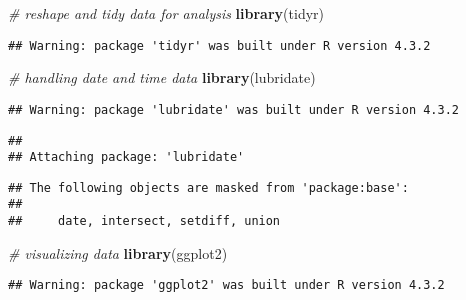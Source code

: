 \documentclass[
]{article}
\newenvironment{Shaded}{\begin{snugshade}}{\end{snugshade}}
\newcommand{\CommentTok}[1]{\textcolor[rgb]{0.56,0.35,0.01}{\textit{#1}}}
\newcommand{\FunctionTok}[1]{\textcolor[rgb]{0.13,0.29,0.53}{\textbf{#1}}}
\newcommand{\NormalTok}[1]{#1}
\begin{document}
\begin{Shaded}
\begin{Highlighting}[]
\CommentTok{\# reshape and tidy data for analysis}
\FunctionTok{library}\NormalTok{(tidyr)}
\end{Highlighting}
\end{Shaded}

\begin{verbatim}
## Warning: package 'tidyr' was built under R version 4.3.2
\end{verbatim}

\begin{Shaded}
\begin{Highlighting}[]
\CommentTok{\# handling date and time data}
\FunctionTok{library}\NormalTok{(lubridate)}
\end{Highlighting}
\end{Shaded}

\begin{verbatim}
## Warning: package 'lubridate' was built under R version 4.3.2
\end{verbatim}

\begin{verbatim}
## 
## Attaching package: 'lubridate'
\end{verbatim}

\begin{verbatim}
## The following objects are masked from 'package:base':
## 
##     date, intersect, setdiff, union
\end{verbatim}

\begin{Shaded}
\begin{Highlighting}[]
\CommentTok{\# visualizing data}
\FunctionTok{library}\NormalTok{(ggplot2)}
\end{Highlighting}
\end{Shaded}

\begin{verbatim}
## Warning: package 'ggplot2' was built under R version 4.3.2
\end{verbatim}
\end{document}
